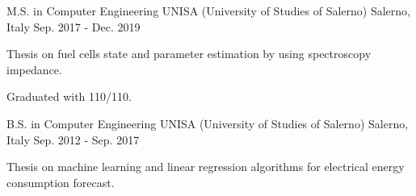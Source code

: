 

\begin{cventries}

  \cventry
    {M.S. in Computer Engineering} %
    {UNISA (University of Studies of Salerno)} %
    {Salerno, Italy} %
    {Sep. 2017 - Dec. 2019} %
    {
      \begin{cvitems} %
        \item {Thesis on fuel cells state and parameter estimation by using spectroscopy impedance.}
        \item {Graduated with 110/110.}
      \end{cvitems}
    }

  \cventry
    {B.S. in Computer Engineering} %
    {UNISA (University of Studies of Salerno)} %
    {Salerno, Italy} %
    {Sep. 2012 - Sep. 2017} %
    {
      \begin{cvitems} %
        \item {Thesis on machine learning and linear regression algorithms for electrical energy consumption forecast.}
      \end{cvitems}
    }

\end{cventries}
